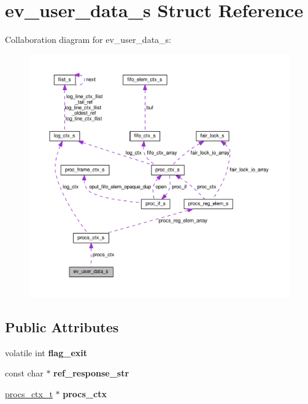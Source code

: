 \hypertarget{structev__user__data__s}{}\section{ev\+\_\+user\+\_\+data\+\_\+s Struct Reference}
\label{structev__user__data__s}


Collaboration diagram for ev\+\_\+user\+\_\+data\+\_\+s\+:\nopagebreak
\begin{figure}[H]
\begin{center}
\leavevmode
\includegraphics[width=350pt]{structev__user__data__s__coll__graph}
\end{center}
\end{figure}
\subsection*{Public Attributes}
\begin{DoxyCompactItemize}
\item 
volatile int {\bfseries flag\+\_\+exit}\hypertarget{structev__user__data__s_a010eedfb6b14ae4ab846b2591cf2bd77}{}\label{structev__user__data__s_a010eedfb6b14ae4ab846b2591cf2bd77}

\item 
const char $\ast$ {\bfseries ref\+\_\+response\+\_\+str}\hypertarget{structev__user__data__s_a3b19ac3b97facb48997d55182b9d8f1f}{}\label{structev__user__data__s_a3b19ac3b97facb48997d55182b9d8f1f}

\item 
\hyperlink{procs_8c_a9dcafd40720bff127bdc596e9c6dd6cd}{procs\+\_\+ctx\+\_\+t} $\ast$ {\bfseries procs\+\_\+ctx}\hypertarget{structev__user__data__s_adeb43bada9d600be6b05322982cc248f}{}\label{structev__user__data__s_adeb43bada9d600be6b05322982cc248f}

\end{DoxyCompactItemize}


